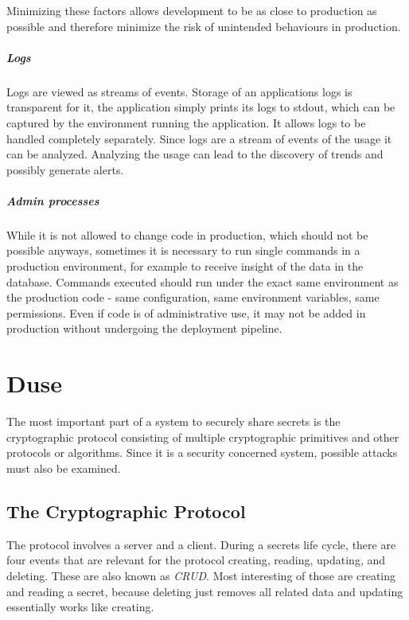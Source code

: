 Minimizing these factors allows development to be as close to production as
possible and therefore minimize the risk of unintended behaviours in
production.

\paragraph{Logs}

Logs are viewed as streams of events. Storage of an applications logs is
transparent for it, the application simply prints its logs to stdout, which can
be captured by the environment running the application. It allows logs to be
handled completely separately. Since logs are a stream of events of the usage
it can be analyzed. Analyzing the usage can lead to the discovery of trends and
possibly generate alerts.

\paragraph{Admin processes}

While it is not allowed to change code in production, which should not be
possible anyways, sometimes it is necessary to run single commands in a
production environment, for example to receive insight of the data in the
database. Commands executed should run under the exact same environment as the
production code - same configuration, same environment variables, same
permissions. Even if code is of administrative use, it may not be added in
production without undergoing the deployment pipeline.

\chapter{Duse}

The most important part of a system to securely share secrets is the
cryptographic protocol consisting of multiple cryptographic primitives and
other protocols or algorithms. Since it is a security concerned system,
possible attacks must also be examined.

\section{The Cryptographic Protocol}
\label{sec:duse:crypto_protocol}

The protocol involves a server and a client. During a secrets life cycle, there
are four events that are relevant for the protocol creating, reading, updating,
and deleting. These are also known as \textit{CRUD}. Most interesting of those
are creating and reading a secret, because deleting just removes all related
data and updating essentially works like creating.

